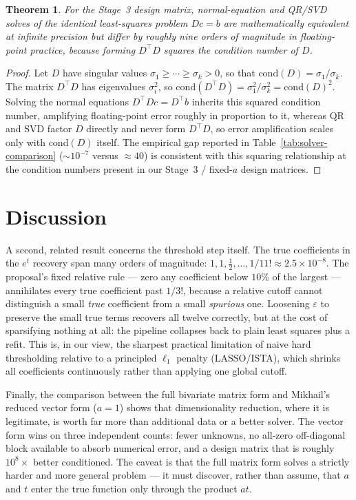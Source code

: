 \documentclass[11pt]{article}
\newtheorem{theorem}{Theorem}
\begin{document}
\begin{theorem}
For the Stage~3 design matrix, normal-equation and QR/SVD solves of the identical
least-squares problem $Dc=b$ are mathematically equivalent at infinite precision but
differ by roughly nine orders of magnitude in floating-point practice, because forming
$D^{\top}D$ squares the condition number of $D$.
\end{theorem}
\begin{proof}
Let $D$ have singular values $\sigma_1 \ge \cdots \ge \sigma_k > 0$, so that
$\mathrm{cond}(D) = \sigma_1/\sigma_k$. The matrix $D^{\top}D$ has eigenvalues
$\sigma_i^2$, so $\mathrm{cond}(D^{\top}D) = \sigma_1^2/\sigma_k^2 = \mathrm{cond}(D)^2$.
Solving the normal equations $D^{\top}Dc = D^{\top}b$ inherits this squared condition
number, amplifying floating-point error roughly in proportion to it, whereas QR and SVD
factor $D$ directly and never form $D^{\top}D$, so error amplification scales only with
$\mathrm{cond}(D)$ itself. The empirical gap reported in Table~\ref{tab:solver-comparison}
($\sim 10^{-7}$ versus $\approx 40$) is consistent with this squaring relationship at the
condition numbers present in our Stage~3 / fixed-$a$ design matrices.
\end{proof}

\section{Discussion}

A second, related result concerns the threshold step itself. The true coefficients in
the $e^{t}$ recovery span many orders of magnitude: $1, 1, \tfrac12, \dots,
1/11! \approx 2.5\times 10^{-8}$. The proposal's fixed relative rule --- zero any
coefficient below $10\%$ of the largest --- annihilates every true coefficient past
$1/3!$, because a relative cutoff cannot distinguish a small \emph{true} coefficient from
a small \emph{spurious} one. Loosening $\varepsilon$ to preserve the small true terms
recovers all twelve correctly, but at the cost of sparsifying nothing at all: the
pipeline collapses back to plain least squares plus a refit. This is, in our view, the
sharpest practical limitation of naive hard thresholding relative to a principled
$\ell_1$ penalty (LASSO/ISTA), which shrinks all coefficients continuously rather than
applying one global cutoff.

Finally, the comparison between the full bivariate matrix form and Mikhail's reduced
vector form ($a=1$) shows that dimensionality reduction, where it is legitimate, is worth
far more than additional data or a better solver. The vector form wins on three
independent counts: fewer unknowns, no all-zero off-diagonal block available to absorb
numerical error, and a design matrix that is roughly $10^{8}\times$ better conditioned.
The caveat is that the full matrix form solves a strictly harder and more general
problem --- it must discover, rather than assume, that $a$ and $t$ enter the true
function only through the product $at$.
\end{document}
